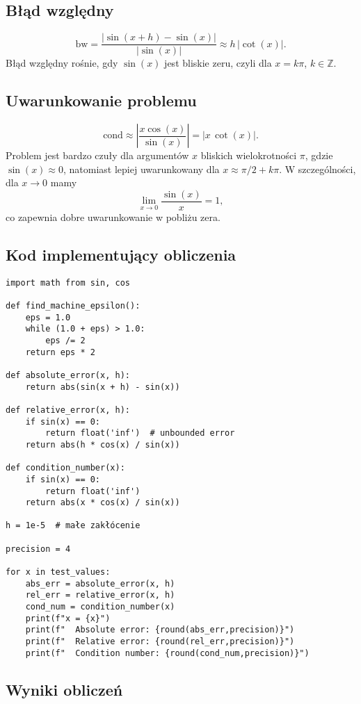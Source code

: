 \documentclass{article}
\begin{document}
\subsection{Błąd względny}
\[
\text{bw} = \frac{|\sin(x+h) - \sin(x)|}{|\sin(x)|} \approx h\, |\cot(x)|.
\]
Błąd względny rośnie, gdy $\sin(x)$ jest bliskie zeru, czyli dla $x=k\pi$, $k\in\mathbb{Z}$.

\subsection{Uwarunkowanie problemu} 
\[
\text{cond} \approx \left|\frac{x\cos(x)}{\sin(x)}\right| = |x\,\cot(x)|.
\]
Problem jest bardzo czuły dla argumentów $x$ bliskich wielokrotności $\pi$, gdzie $\sin(x) \approx 0$, natomiast lepiej uwarunkowany dla $x\approx \pi/2+k\pi$. W szczególności, dla $x\to 0$ mamy
\[
\lim_{x\to0}\frac{\sin(x)}{x} = 1,
\]
co zapewnia dobre uwarunkowanie w pobliżu zera.

\subsection{Kod implementujący obliczenia}

\begin{verbatim}
import math from sin, cos

def find_machine_epsilon():
    eps = 1.0
    while (1.0 + eps) > 1.0:
        eps /= 2
    return eps * 2

def absolute_error(x, h):
    return abs(sin(x + h) - sin(x))

def relative_error(x, h):
    if sin(x) == 0:
        return float('inf')  # unbounded error
    return abs(h * cos(x) / sin(x))

def condition_number(x):
    if sin(x) == 0:
        return float('inf')
    return abs(x * cos(x) / sin(x))

h = 1e-5  # małe zakłócenie

precision = 4

for x in test_values:
    abs_err = absolute_error(x, h)
    rel_err = relative_error(x, h)
    cond_num = condition_number(x)
    print(f"x = {x}")
    print(f"  Absolute error: {round(abs_err,precision)}")
    print(f"  Relative error: {round(rel_err,precision)}")
    print(f"  Condition number: {round(cond_num,precision)}")
\end{verbatim}

\subsection{Wyniki obliczeń}
\end{document}
